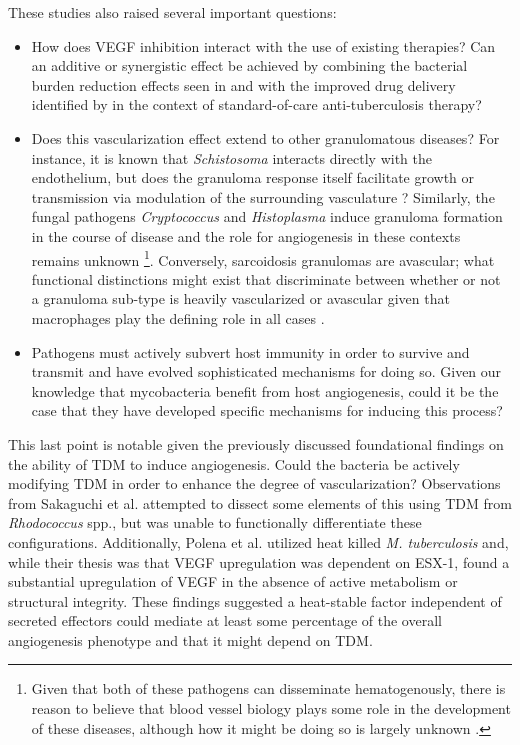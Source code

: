 These studies also raised several important questions:

\begin{itemize}
\item How does VEGF inhibition interact with the use of existing therapies? Can an additive or synergistic effect be achieved by combining the bacterial burden reduction effects seen in \citet{Oehlers2015} and \citet{Polena2016} with the improved drug delivery identified by \citet{Datta2015} in the context of standard\hyp{}of\hyp{}care anti\hyp{}tuberculosis therapy?
\item Does this vascularization effect extend to other granulomatous diseases? For instance, it is known that \textit{Schistosoma} interacts directly with the endothelium, but does the granuloma response itself facilitate growth or transmission via modulation of the surrounding vasculature \citep{Chaves1966, Shariati2011, Pereira2013}? Similarly, the fungal pathogens \textit{Cryptococcus} and \textit{Histoplasma} induce granuloma formation in the course of disease and the role for angiogenesis in these contexts remains unknown \citep{Coenjaerts2004, Martidis1999}\footnote{Given that both of these pathogens can disseminate hematogenously, there is reason to believe that blood vessel biology plays some role in the development of these diseases, although how it might be doing so is largely unknown \citep{Kauffman2007}.}. Conversely, sarcoidosis granulomas are avascular; what functional distinctions might exist that discriminate between whether or not a granuloma sub\hyp{}type is heavily vascularized or avascular given that macrophages play the defining role in all cases \citep{Kambouchner2011}.
\item Pathogens must actively subvert host immunity in order to survive and transmit and have evolved sophisticated mechanisms for doing so. Given our knowledge that mycobacteria benefit from host angiogenesis, could it be the case that they have developed specific mechanisms for inducing this process? 
\end{itemize}

This last point is notable given the previously discussed foundational findings on the ability of TDM to induce angiogenesis. Could the bacteria be actively modifying TDM in order to enhance the degree of vascularization? Observations from Sakaguchi et al. attempted to dissect some elements of this using TDM from \textit{Rhodococcus} spp., but was unable to functionally differentiate these configurations. Additionally, Polena et al. utilized heat killed \textit{M. tuberculosis} and, while their thesis was that VEGF upregulation was dependent on ESX\hyp{}1, found a substantial upregulation of VEGF in the absence of active metabolism or structural integrity. These findings suggested a heat\hyp{}stable factor independent of secreted effectors could mediate at least some percentage of the overall angiogenesis phenotype and that it might depend on TDM.


